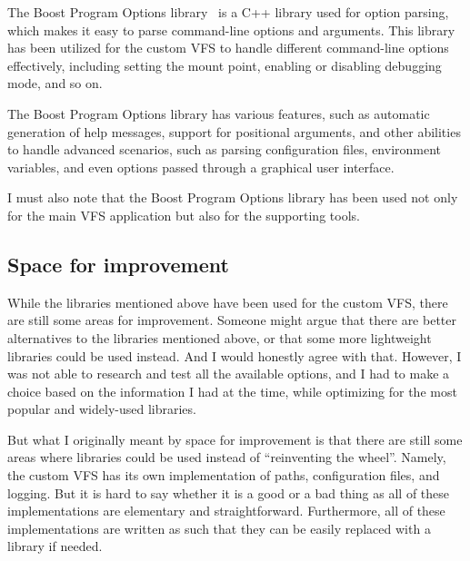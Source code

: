 The Boost Program Options library~\cite{boost_program_options} is a C++ library used for option parsing, which makes it easy to parse command-line options and arguments.
This library has been utilized for the custom VFS to handle different command-line options effectively, including setting the mount point, enabling or disabling debugging mode, and so on.

The Boost Program Options library has various features, such as automatic generation of help messages, support for positional arguments, and other abilities to handle advanced scenarios, such as parsing configuration files, environment variables, and even options passed through a graphical user interface.

I must also note that the Boost Program Options library has been used not only for the main VFS application but also for the supporting tools.

\subsection{Space for improvement}\label{subsec:libs-space-for-improvement}

While the libraries mentioned above have been used for the custom VFS, there are still some areas for improvement.
Someone might argue that there are better alternatives to the libraries mentioned above, or that some more lightweight libraries could be used instead.
And I would honestly agree with that.
However, I was not able to research and test all the available options, and I had to make a choice based on the information I had at the time, while optimizing for the most popular and widely-used libraries.

But what I originally meant by space for improvement is that there are still some areas where libraries could be used instead of ``reinventing the wheel''.
Namely, the custom VFS has its own implementation of paths, configuration files, and logging.
But it is hard to say whether it is a good or a bad thing as all of these implementations are elementary and straightforward.
Furthermore, all of these implementations are written as such that they can be easily replaced with a library if needed.